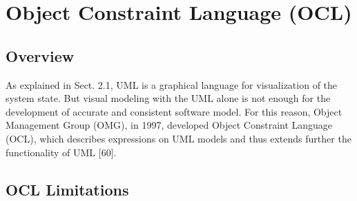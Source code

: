 \section{Object Constraint Language (OCL)}

\subsection{Overview}

\hspace{1cm} As explained in Sect. 2.1, UML is a graphical language for visualization of the system
state. But visual modeling with the UML alone is not enough for the development of
accurate and consistent software model. For this reason, Object Management Group
(OMG), in 1997, developed Object Constraint Language (OCL), which describes 
expressions on UML models and thus extends further the functionality of UML [60].


\subsection{OCL Limitations}